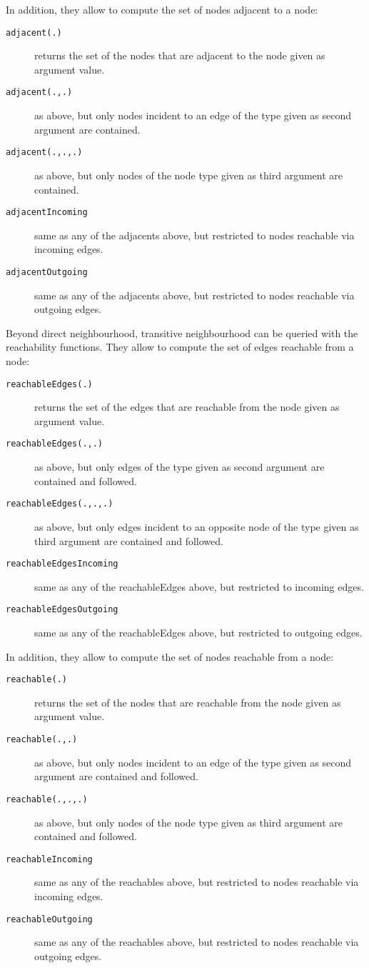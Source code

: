 In addition, they allow to compute the set of nodes adjacent to a node:

\begin{description}
\item[\texttt{adjacent(.)}] returns the set of the nodes that are adjacent to the node given as argument value.
\item[\texttt{adjacent(.,.)}] as above, but only nodes incident to an edge of the type given as second argument are contained.
\item[\texttt{adjacent(.,.,.)}] as above, but only nodes of the node type given as third argument are contained.
\item[\texttt{adjacentIncoming}] same as any of the adjacents above, but restricted to nodes reachable via incoming edges.
\item[\texttt{adjacentOutgoing}] same as any of the adjacents above, but restricted to nodes reachable via outgoing edges.
\end{description}

Beyond direct neighbourhood, transitive neighbourhood can be queried with the reachability functions.
They allow to compute the set of edges reachable from a node:

\begin{description}
\item[\texttt{reachableEdges(.)}] returns the set of the edges that are reachable from the node given as argument value.
\item[\texttt{reachableEdges(.,.)}] as above, but only edges of the type given as second argument are contained and followed.
\item[\texttt{reachableEdges(.,.,.)}] as above, but only edges incident to an opposite node of the type given as third argument are contained and followed.
\item[\texttt{reachableEdgesIncoming}] same as any of the reachableEdges above, but restricted to incoming edges.
\item[\texttt{reachableEdgesOutgoing}] same as any of the reachableEdges above, but restricted to outgoing edges.
\end{description}

In addition, they allow to compute the set of nodes reachable from a node:

\begin{description}
\item[\texttt{reachable(.)}] returns the set of the nodes that are reachable from the node given as argument value.
\item[\texttt{reachable(.,.)}] as above, but only nodes incident to an edge of the type given as second argument are contained and followed.
\item[\texttt{reachable(.,.,.)}] as above, but only nodes of the node type given as third argument are contained and followed.
\item[\texttt{reachableIncoming}] same as any of the reachables above, but restricted to nodes reachable via incoming edges.
\item[\texttt{reachableOutgoing}] same as any of the reachables above, but restricted to nodes reachable via outgoing edges.
\end{description}

 